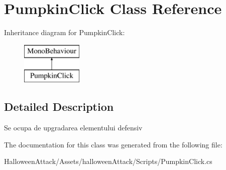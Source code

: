 \hypertarget{class_pumpkin_click}{}\section{Pumpkin\+Click Class Reference}
\label{class_pumpkin_click}
Inheritance diagram for Pumpkin\+Click\+:\begin{figure}[H]
\begin{center}
\leavevmode
\includegraphics[height=2.000000cm]{class_pumpkin_click}
\end{center}
\end{figure}


\subsection{Detailed Description}
Se ocupa de upgradarea elementului defensiv 

The documentation for this class was generated from the following file\+:\begin{DoxyCompactItemize}
\item 
Halloween\+Attack/\+Assets/halloween\+Attack/\+Scripts/Pumpkin\+Click.\+cs\end{DoxyCompactItemize}
